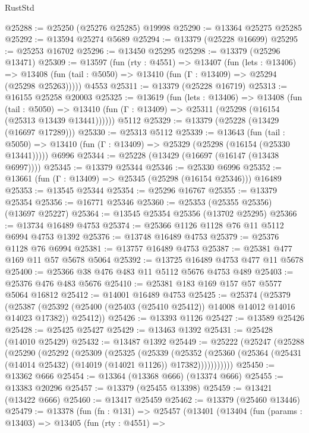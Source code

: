 \begin{lexlean}{RustStd}
\begin{coremodule}
@25288 := @25250 (@25276 @25285) @19998
@25290 := @13364 @25275 @25285
@25292 := @13594 @25274 @5689
@25294 := @13379 (@25228 @16699)
@25295 := @25253 @16702
@25296 := @13450 @25295
@25298 := @13379 (@25296 @13471)
@25309 := @13597
    (fun (rty : @4551) =>
    @13407
      (fun (lets : @13406) =>
      @13408 (fun (tail : @5050) => @13410 (fun (Γ : @13409) => @25294 (@25298 @25263)))))
    @4553
@25311 := @13379 (@25228 @16719)
@25313 := @16155 @25258 @20003
@25325 := @13619
    (fun (lets : @13406) =>
    @13408
      (fun (tail : @5050) =>
      @13410 (fun (Γ : @13409) => @25311 (@25298 (@16154 (@25313 @13439 @13441))))))
    @5112
@25329 := @13379 (@25228 (@13429 (@16697 @17289)))
@25330 := @25313 @5112
@25339 := @13643
    (fun (tail : @5050) => @13410 (fun (Γ : @13409) => @25329 (@25298 (@16154 (@25330 @13441)))))
    @6996
@25344 := @25228 (@13429 (@16697 (@16147 (@13438 @6997))))
@25345 := @13379 @25344
@25346 := @25330 @6996
@25352 := @13661 (fun (Γ : @13409) => @25345 (@25298 (@16154 @25346))) @16489
@25353 := @13545 @25344
@25354 := @25296 @16767
@25355 := @13379 @25354
@25356 := @16771 @25346
@25360 := @25353 (@25355 @25356) (@13697 @25227)
@25364 := @13545 @25354 @25356 (@13702 @25295)
@25366 := @13734 @16489 @4753
@25374 := @25366 @1126 @1128 @76 @11 @5112 @6994 @4753 @1392
@25376 := @13748 @16489 @4753
@25379 := @25376 @1128 @76 @6994
@25381 := @13757 @16489 @4753
@25387 := @25381 @477 @169 @11 @57 @5678 @5064
@25392 := @13725 @16489 @4753 @477 @11 @5678
@25400 := @25366 @38 @476 @483 @11 @5112 @5676 @4753 @489
@25403 := @25376 @476 @483 @5676
@25410 := @25381 @183 @169 @157 @57 @5577 @5064 @16812
@25412 := @14001 @16489 @4753
@25425 := @25374
    (@25379
      (@25387 (@25392 (@25400 (@25403 (@25410 @25412)) @14008 @14012 @14016 @14023 @17382)) @25412))
@25426 := @13393 @1126
@25427 := @13589 @25426
@25428 := @25425 @25427
@25429 := @13463 @1392
@25431 := @25428 (@14010 @25429)
@25432 := @13487 @1392
@25449 := @25222
    (@25247
      (@25288
        (@25290
          (@25292
            (@25309
              (@25325
                (@25339
                  (@25352
                    (@25360
                      (@25364 (@25431 (@14014 @25432) (@14019 (@14021 @1126)) @17382)))))))))))
@25450 := @13362 @666
@25454 := @13364 (@13368 @666) (@13374 @666)
@25455 := @13383 @20296
@25457 := @13379 (@25455 @13398)
@25459 := @13421 (@13422 @666)
@25460 := @13417 @25459
@25462 := @13379 (@25460 @13446)
@25479 := @13378
    (fun (fn : @131) =>
    @25457
      (@13401
        (@13404
          (fun (params : @13403) =>
          @13405
            (fun (rty : @4551) =>

\end{coremodule}
\end{lexlean}

